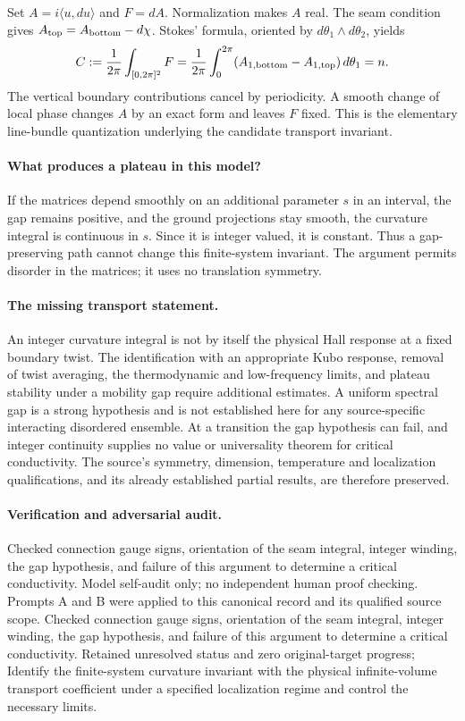 \documentclass[11pt]{article}
\begin{document}
Set $A=i\langle u,du\rangle$ and $F=dA$. Normalization makes $A$ real. The seam condition gives $A_{\rm top}=A_{\rm bottom}-d\chi$. Stokes' formula, oriented by $d\theta_1\wedge d\theta_2$, yields
\[
 C:=\frac1{2\pi}\int_{[0,2\pi]^2}F
 =\frac1{2\pi}\int_0^{2\pi}
       (A_{1,\rm bottom}-A_{1,\rm top})\,d\theta_1
 =n.
\]
The vertical boundary contributions cancel by periodicity. A smooth change of local phase changes $A$ by an exact form and leaves $F$ fixed. This is the elementary line-bundle quantization underlying the candidate transport invariant.

\paragraph{What produces a plateau in this model?}
If the matrices depend smoothly on an additional parameter $s$ in an interval, the gap remains positive, and the ground projections stay smooth, the curvature integral is continuous in $s$. Since it is integer valued, it is constant. Thus a gap-preserving path cannot change this finite-system invariant. The argument permits disorder in the matrices; it uses no translation symmetry.

\paragraph{The missing transport statement.}
An integer curvature integral is not by itself the physical Hall response at a fixed boundary twist. The identification with an appropriate Kubo response, removal of twist averaging, the thermodynamic and low-frequency limits, and plateau stability under a mobility gap require additional estimates. A uniform spectral gap is a strong hypothesis and is not established here for any source-specific interacting disordered ensemble. At a transition the gap hypothesis can fail, and integer continuity supplies no value or universality theorem for critical conductivity. The source's symmetry, dimension, temperature and localization qualifications, and its already established partial results, are therefore preserved.

\paragraph{Verification and adversarial audit.}
Checked connection gauge signs, orientation of the seam integral, integer winding, the gap hypothesis, and failure of this argument to determine a critical conductivity. Model self-audit only; no independent human proof checking. Prompts A and B were applied to this canonical record and its qualified source scope. Checked connection gauge signs, orientation of the seam integral, integer winding, the gap hypothesis, and failure of this argument to determine a critical conductivity. Retained unresolved status and zero original-target progress; Identify the finite-system curvature invariant with the physical infinite-volume transport coefficient under a specified localization regime and control the necessary limits.
\end{document}
